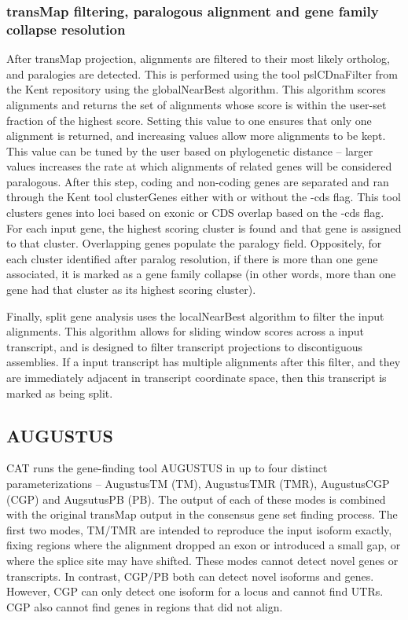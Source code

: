\documentclass[fleqn,10pt]{wlscirep}
\begin{document}
\subsubsection*{transMap filtering, paralogous alignment and gene family collapse resolution}
	After transMap projection, alignments are filtered to their most likely ortholog, and paralogies are detected. This is performed using the tool pslCDnaFilter from the Kent repository using the globalNearBest algorithm. This algorithm scores alignments and returns the set of alignments whose score is within the user-set fraction of the highest score. Setting this value to one ensures that only one alignment is returned, and increasing values allow more alignments to be kept. This value can be tuned by the user based on phylogenetic distance -- larger values increases the rate at which alignments of related genes will be considered paralogous. After this step, coding and non-coding genes are separated and ran through the Kent tool clusterGenes either with or without the -cds flag. This tool clusters genes into loci based on exonic or CDS overlap based on the -cds flag. For each input gene, the highest scoring cluster is found and that gene is assigned to that cluster. Overlapping genes populate the paralogy field. Oppositely, for each cluster identified after paralog resolution, if there is more than one gene associated, it is marked as a gene family collapse (in other words, more than one gene had that cluster as its highest scoring cluster).
    
    Finally, split gene analysis uses the localNearBest algorithm to filter the input alignments. This algorithm allows for sliding window scores across a input transcript, and is designed to filter transcript projections to discontiguous assemblies. If a input transcript has multiple alignments after this filter, and they are immediately adjacent in transcript coordinate space, then this transcript is marked as being split.

\subsection*{AUGUSTUS}
	CAT runs the gene-finding tool AUGUSTUS in up to four distinct parameterizations -- AugustusTM (TM), AugustusTMR (TMR), AugustusCGP (CGP) and AugsutusPB (PB). The output of each of these modes is combined with the original transMap output in the consensus gene set finding process. The first two modes, TM/TMR are intended to reproduce the input isoform exactly, fixing regions where the alignment dropped an exon or introduced a small gap, or where the splice site may have shifted. These modes cannot detect novel genes or transcripts. In contrast, CGP/PB both can detect novel isoforms and genes. However, CGP can only detect one isoform for a locus and cannot find UTRs. CGP also cannot find genes in regions that did not align. 
  
\end{document}
